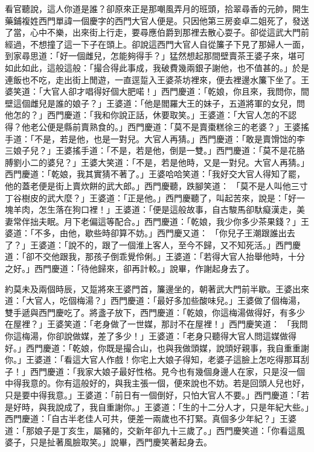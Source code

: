 看官聽說，這人你道是誰？卻原來正是那嘲風弄月的班頭，拾翠尋香的元帥，開生藥鋪複姓西門單諱一個慶字的西門大官人便是。只因他第三房妾卓二姐死了，發送了當，心中不樂，出來街上行走，要尋應伯爵到那裡去散心耍子。卻從這武大門前經過，不想撞了這一下子在頭上。卻說這西門大官人自從簾子下見了那婦人一面，到家尋思道：「好一個雌兒，怎能夠得手？」猛然想起那間壁賣茶王婆子來，堪可如此如此，這般這般：「撮合得此事成，我破費幾兩銀子謝他，也不值甚的。」於是連飯也不吃，走出街上閒遊，一直逕踅入王婆茶坊裡來，便去裡邊水簾下坐了。王婆笑道：「大官人卻才唱得好個大肥喏！」西門慶道：「乾娘，你且來，我問你，間壁這個雌兒是誰的娘子？」王婆道：「他是閻羅大王的妹子，五道將軍的女兒，問他怎的？」西門慶道：「我和你說正話，休要取笑。」王婆道：「大官人怎的不認得？他老公便是縣前賣熟食的。」西門慶道：「莫不是賣棗糕徐三的老婆？」王婆搖手道：「不是，若是他，也是一對兒。大官人再猜。」西門慶道：「敢是賣馉饳的李三娘子兒？」王婆搖手道：「不是，若是他，倒是一雙。」西門慶道：「莫不是花胳膊劉小二的婆兒？」王婆大笑道：「不是，若是他時，又是一對兒。大官人再猜。」西門慶道：「乾娘，我其實猜不著了。」王婆哈哈笑道：「我好交大官人得知了罷，他的蓋老便是街上賣炊餅的武大郎。」西門慶聽，跌腳笑道： 「莫不是人叫他三寸丁谷樹皮的武大麼？」王婆道：「正是他。」西門慶聽了，叫起苦來，說是：「好一塊羊肉，怎生落在狗口裡！」王婆道：「便是這般故事，自古駿馬卻馱癡漢走，美妻常伴拙夫眠。月下老偏這等配合。」西門慶道：「乾娘，我少你多少茶果錢？」王婆道：「不多，由他，歇些時卻算不妨。」西門慶又道： 「你兒子王潮跟誰出去了？」王婆道：「說不的，跟了一個淮上客人，至今不歸，又不知死活。」西門慶道：「卻不交他跟我，那孩子倒乖覺伶俐。」王婆道：「若得大官人抬舉他時，十分之好。」西門慶道：「待他歸來，卻再計較。」說畢，作謝起身去了。

約莫未及兩個時辰，又踅將來王婆門首，簾邊坐的，朝著武大門前半歇。王婆出來道：「大官人，吃個梅湯？」西門慶道：「最好多加些酸味兒。」王婆做了個梅湯，雙手遞與西門慶吃了。將盞子放下，西門慶道：「乾娘，你這梅湯做得好，有多少在屋裡？」王婆笑道：「老身做了一世媒，那討不在屋裡！」西門慶笑道： 「我問你這梅湯，你卻說做媒，差了多少！」王婆道：「老身只聽得大官人問這媒做得好。」西門慶道：「乾娘，你既是撮合山，也與我做頭媒，說頭好親事，我自重重謝你。」王婆道：「看這大官人作戲！你宅上大娘子得知，老婆子這臉上怎吃得那耳刮子！」西門慶道：「我家大娘子最好性格。見今也有幾個身邊人在家，只是沒一個中得我意的。你有這般好的，與我主張一個，便來說也不妨。若是回頭人兒也好，只是要中得我意。」王婆道：「前日有一個倒好，只怕大官人不要。」西門慶道：「若是好時，與我說成了，我自重謝你。」王婆道：「生的十二分人才，只是年紀大些。」西門慶道：「自古半老佳人可共，便差一兩歲也不打緊。真個多少年紀？」王婆道：「那娘子是丁亥生，屬豬的，交新年卻九十三歲了。」西門慶笑道：「你看這風婆子，只是扯著風臉取笑。」說畢，西門慶笑著起身去。

